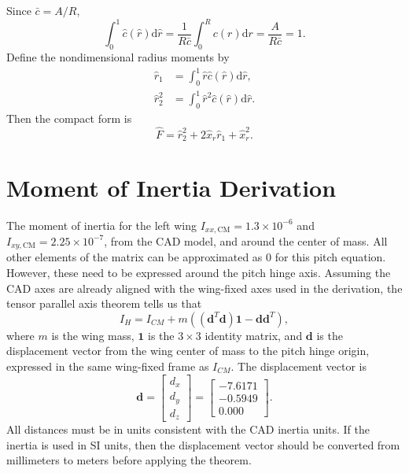 \documentclass{article}
\newcommand{\D}{\mathrm{d}}
\begin{document}
Since \(\bar{c} = A/R\),
\begin{equation}
    \int_0^1 \hat{c}(\hat{r}) \D \hat{r}
        = \frac{1}{R\bar{c}}\int_0^R c(r) \D r
        = \frac{A}{R\bar{c}}
        = 1.
\end{equation}
Define the nondimensional radius moments by
\begin{align}
    \hat{r}_1
        &= \int_0^1 \hat{r}\hat{c}(\hat{r}) \D \hat{r}, \\
    \hat{r}_2^2
        &= \int_0^1 \hat{r}^2\hat{c}(\hat{r}) \D \hat{r}.
\end{align}
Then the compact form is
\begin{equation}
    \hat{F}
        = \hat{r}_2^2
          + 2\hat{x}_r\hat{r}_1
          + \hat{x}_r^2.
\end{equation}

\section{Moment of Inertia Derivation}
\label{sec:moment_of_inertia} 
The moment of inertia for the left wing \(I_{xx,\mathrm{CM}} = 1.3 \times 10^{-6}\) and \(I_{xy,\mathrm{CM}} = 2.25 \times 10^{-7}\), from the CAD model, and around the center of mass. All other elements of the matrix can be approximated as 0 for this pitch equation. However, these need to be expressed around the pitch hinge axis. Assuming the CAD axes are already aligned with the wing-fixed axes used in the derivation, the tensor parallel axis theorem tells us that 
\begin{equation}
I_H
=
I_{CM}
+
m\left((\mathbf{d}^T \mathbf{d})\mathbf{1} - \mathbf{d}\mathbf{d}^T\right),
\end{equation}
where \(m\) is the wing mass, \(\mathbf{1}\) is the \(3 \times 3\) identity matrix, and \(\mathbf{d}\) is the displacement vector from the wing center of mass to the pitch hinge origin, expressed in the same wing-fixed frame as \(I_{CM}\). The displacement vector is
\begin{equation}
\mathbf{d}
=
\begin{bmatrix}
d_x \\
d_y \\
d_z
\end{bmatrix}
=
\begin{bmatrix}
-7.6171 \\
-0.5949 \\
0.000
\end{bmatrix}.
\end{equation}
All distances must be in units consistent with the CAD inertia units. If the inertia is used in SI units, then the displacement vector should be converted from millimeters to meters before applying the theorem.
\end{document}
